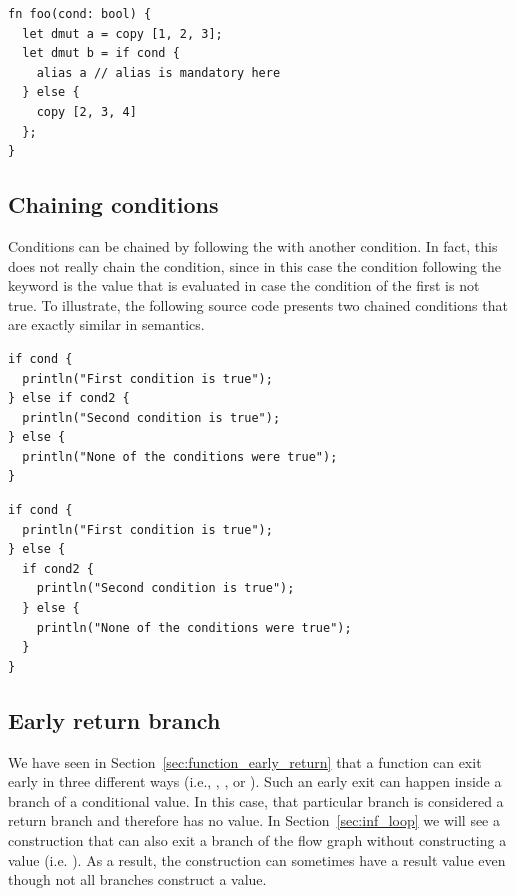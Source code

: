 \begin{lstlisting}[style=coloredverbatim, escapechar=@]
fn foo(cond: bool) {
  let dmut a = copy [1, 2, 3];
  let dmut b = if cond {
    alias a // alias is mandatory here
  } else {
    copy [2, 3, 4]
  };
}
\end{lstlisting}


\subsection{Chaining conditions}

Conditions can be chained by following the  with another
 condition. In fact, this does not really chain the condition, since
in this case the  condition following the  keyword is
the value that is evaluated in case the condition of the first  is
not true. To illustrate, the following source code presents two chained
 conditions that are exactly similar in semantics.


\begin{minipage}[t][][t]{0.47\linewidth}
\begin{lstlisting}[style=coloredverbatim, escapechar=@, caption=Using a \token{if} as the value of the \token{else} branch]
if cond {
  println("First condition is true");
} else if cond2 {
  println("Second condition is true");
} else {
  println("None of the conditions were true");
}
\end{lstlisting}
\end{minipage}\hspace{10pt}%
\begin{minipage}[t][][t]{0.47\linewidth}
  \begin{lstlisting}[style=coloredverbatim, escapechar=@, caption=Using a block as the value of the \token{else} branch]
if cond {
  println("First condition is true");
} else {
  if cond2 {
    println("Second condition is true");
  } else {
    println("None of the conditions were true");
  }
}
  \end{lstlisting}
\end{minipage}
\vspace{-10pt}%

\subsection{Early return branch}

We have seen in Section~\ref{sec:function_early_return} that a function can exit
early in three different ways (i.e., , , or
). Such an early exit can happen inside a branch of a conditional
value. In this case, that particular branch is considered a return branch and
therefore has no value. In Section~\ref{sec:inf_loop} we will see a construction
that can also exit a branch of the flow graph without constructing a value (i.e.
). As a result, the  construction can sometimes have a
result value even though not all branches construct a value.

